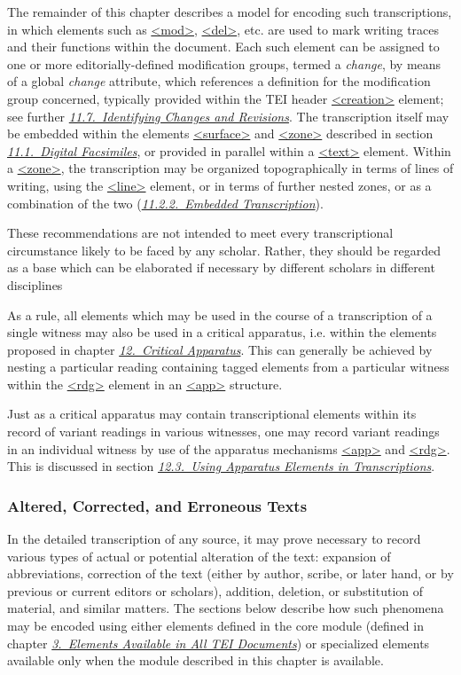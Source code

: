The remainder of this chapter describes a model for encoding such transcriptions, in which elements such as \hyperref[TEI.mod]{<mod>}, \hyperref[TEI.del]{<del>}, etc. are used to mark writing traces and their functions within the document. Each such element can be assigned to one or more editorially-defined modification groups, termed a \textit{change}, by means of a global {\itshape change} attribute, which references a definition for the modification group concerned, typically provided within the TEI header \hyperref[TEI.creation]{<creation>} element; see further \textit{\hyperref[PH-changes]{11.7.\ Identifying Changes and Revisions}}. The transcription itself may be embedded within the elements \hyperref[TEI.surface]{<surface>} and \hyperref[TEI.zone]{<zone>} described in section \textit{\hyperref[PHFAX]{11.1.\ Digital Facsimiles}}, or provided in parallel within a \hyperref[TEI.text]{<text>} element. Within a \hyperref[TEI.zone]{<zone>}, the transcription may be organized topographically in terms of lines of writing, using the \hyperref[TEI.line]{<line>} element, or in terms of further nested zones, or as a combination of the two (\textit{\hyperref[PHZLAB]{11.2.2.\ Embedded Transcription}}).\par
These recommendations are not intended to meet every transcriptional circumstance likely to be faced by any scholar. Rather, they should be regarded as a base which can be elaborated if necessary by different scholars in different disciplines \par
As a rule, all elements which may be used in the course of a transcription of a single witness may also be used in a critical apparatus, i.e. within the elements proposed in chapter \textit{\hyperref[TC]{12.\ Critical Apparatus}}. This can generally be achieved by nesting a particular reading containing tagged elements from a particular witness within the \hyperref[TEI.rdg]{<rdg>} element in an \hyperref[TEI.app]{<app>} structure.\par
Just as a critical apparatus may contain transcriptional elements within its record of variant readings in various witnesses, one may record variant readings in an individual witness by use of the apparatus mechanisms \hyperref[TEI.app]{<app>} and \hyperref[TEI.rdg]{<rdg>}. This is discussed in section \textit{\hyperref[TCTR]{12.3.\ Using Apparatus Elements in Transcriptions}}.
\subsubsection[{Altered, Corrected, and Erroneous Texts}]{Altered, Corrected, and Erroneous Texts}\label{PHCH}\par
In the detailed transcription of any source, it may prove necessary to record various types of actual or potential alteration of the text: expansion of abbreviations, correction of the text (either by author, scribe, or later hand, or by previous or current editors or scholars), addition, deletion, or substitution of material, and similar matters. The sections below describe how such phenomena may be encoded using either elements defined in the core module (defined in chapter \textit{\hyperref[CO]{3.\ Elements Available in All TEI Documents}}) or specialized elements available only when the module described in this chapter is available.
